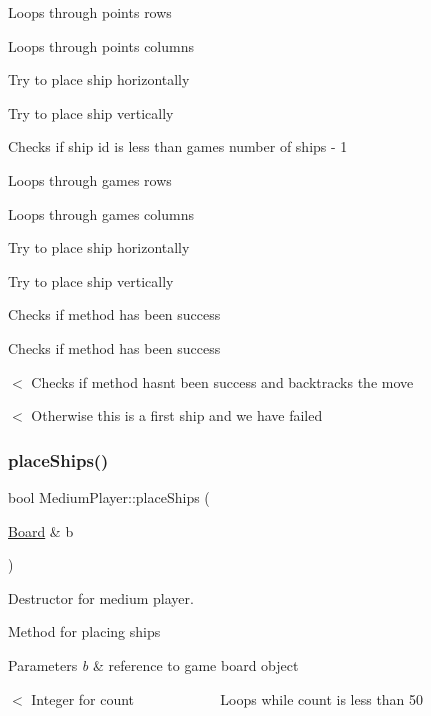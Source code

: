 Loops through point\textquotesingle{}s rows

Loops through point\textquotesingle{}s columns

Try to place ship horizontally

Try to place ship vertically

Checks if ship id is less than game\textquotesingle{}s number of ships -\/ 1

Loops through game\textquotesingle{}s rows

Loops through game\textquotesingle{}s columns

Try to place ship horizontally

Try to place ship vertically

Checks if method has been success

Checks if method has been success

$<$ Checks if method hasn\textquotesingle{}t been success and backtracks the move

$<$ Otherwise this is a first ship and we have failed \mbox{\label{class_medium_player_ac4d4748e2c27a2a51033bbce9f12de26}} 
\subsubsection{\texorpdfstring{place\+Ships()}{placeShips()}}
{\footnotesize\ttfamily bool Medium\+Player\+::place\+Ships (\begin{DoxyParamCaption}\item[{\mbox{\hyperlink{class_board}{Board}} \&}]{b }\end{DoxyParamCaption})\hspace{0.3cm}{\ttfamily [virtual]}}



Destructor for medium player. 

Method for placing ships 
\begin{DoxyParams}{Parameters}
{\em b} & reference to game board object \\
\hline
\end{DoxyParams}
$<$ Integer for count ~\newline
~\newline
~\newline
~\newline
~\newline
~\newline
~\newline
 Loops while count is less than 50

